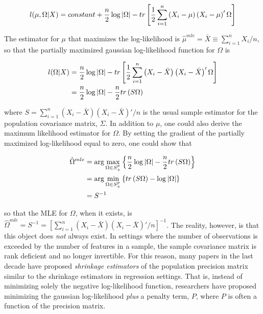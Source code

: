 \documentclass[11pt,]{report}
\theoremstyle{definition}
\theoremstyle{definition}
\theoremstyle{definition}
\theoremstyle{remark}
\begin{document}
\begin{equation}
  l(\mu, \Omega | X) = constant + \frac{n}{2}\log\left| \Omega \right| - tr\left[ \frac{1}{2}\sum_{i = 1}^{n}\left(X_{i} - \mu \right)\left(X_{i} - \mu \right)'\Omega \right]
\label{eq:normalloglik}\notag
\end{equation}

The estimator for \(\mu\) that maximizes the log-likelihood is \(\hat{\mu}^{mle} = \bar{X} \equiv \sum_{i = 1}^{n}X_{i}/n\), so that the partially maximized gaussian log-likelihood function for \(\Omega\) is

\begin{equation}
\begin{split}
  l(\Omega | X) &= \frac{n}{2}\log\left| \Omega \right| - tr\left[ \frac{1}{2}\sum_{i = 1}^{n}\left(X_{i} - \bar{X} \right)\left(X_{i} - \bar{X} \right)'\Omega \right] \\
  &= \frac{n}{2}\log\left| \Omega \right| - \frac{n}{2}tr\left( S\Omega \right)
\label{eq:partialmaxloglik}\notag
\end{split}
\end{equation}

where \(S = \sum_{i = 1}^{n}\left(X_{i} - \bar{X}\right)\left(X_{i} - \bar{X}\right)'/n\) is the usual sample estimator for the population covariance matrix, \(\Sigma\). In addition to \(\mu\), one could also derive the maximum likelihood estimator for \(\Omega\). By setting the gradient of the partially maximized log-likelihood equal to zero, one could show that

\begin{equation}
\begin{split}
\hat{\Omega}^{mle} &= \arg\max_{\Omega \in S_{+}^{p}}\left\{ \frac{n}{2}\log\left| \Omega \right| - \frac{n}{2}tr\left(S\Omega \right) \right\} \\
  &= \arg\min_{\Omega \in S_{+}^{p}}\left\{ tr\left(S\Omega\right) - \log\left|\Omega\right| \right\} \\
  &= S^{-1}
\end{split}
\label{eq:omegamle}\notag
\end{equation}

so that the MLE for \(\Omega\), when it exists, is \(\hat{\Omega}^{mle} = S^{-1} = \left[\sum_{i = 1}^{n}\left(X_{i} - \bar{X}\right)\left(X_{i} - \bar{X}\right)'/n \right]^{-1}\). The reality, however, is that this object does \emph{not} always exist. In settings where the number of observations is exceeded by the number of features in a sample, the sample covariance matrix is rank deficient and no longer invertible. For this reason, many papers in the last decade have proposed \emph{shrinkage estimators} of the population precision matrix similar to the shrinkage estimators in regression settings. That is, instead of minimizing solely the negative log-likelihood function, researchers have proposed minimizing the gaussian log-likelihood \emph{plus} a penalty term, \(P\), where \(P\) is often a function of the precision matrix.
\end{document}
